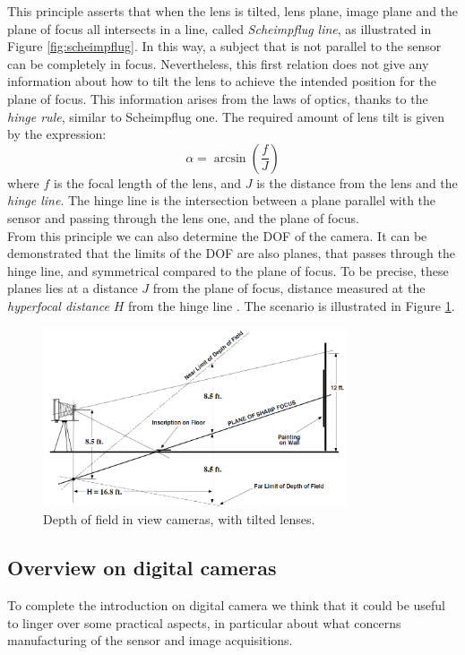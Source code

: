 This principle asserts that when the lens is tilted, lens plane, image plane and the plane of focus all intersects in a line, called \textit{Scheimpflug line}, as illustrated in Figure \ref{fig:scheimpflug}. In this way, a subject that is not parallel to the sensor can be completely in focus. Nevertheless, this first relation does not give any information about how to tilt the lens to achieve the intended position for the plane of focus. This information arises from the laws of optics, thanks to the \textit{hinge rule}, similar to Scheimpflug one. The required amount of lens tilt is given by the expression:
  \begin{equation*}
    \alpha = \arcsin \left( \frac{f}{J} \right)
  \end{equation*}
where $f$ is the focal length of the lens, and $J$ is the distance from the lens and the \textit{hinge line}. The hinge line is the intersection between a plane parallel with the sensor and passing through the lens one, and the plane of focus. \\
From this principle we can also determine the \acs{DOF} of the camera. It can be demonstrated that the limits of the \acs{DOF} are also planes, that passes through the hinge line, and symmetrical compared to the plane of focus. To be precise, these planes lies at a distance $J$ from the plane of focus, distance measured at the \textit{hyperfocal distance} $H$ from the hinge line \cite{book:ftvc}. The scenario is illustrated in Figure \ref{fig:sch_dof}.
  \begin{figure}[h!]
    \centering
    \includegraphics[width=0.8\textwidth]{./images/tech/sch_dof.png}
    \caption{Depth of field in view cameras, with tilted lenses.}
    \label{fig:sch_dof}
  \end{figure}

\subsection{Overview on digital cameras}
\label{subsec:overview-cameras}
To complete the introduction on digital camera we think that it could be useful to linger over some practical aspects, in particular about what concerns manufacturing of the sensor and image acquisitions. \\

